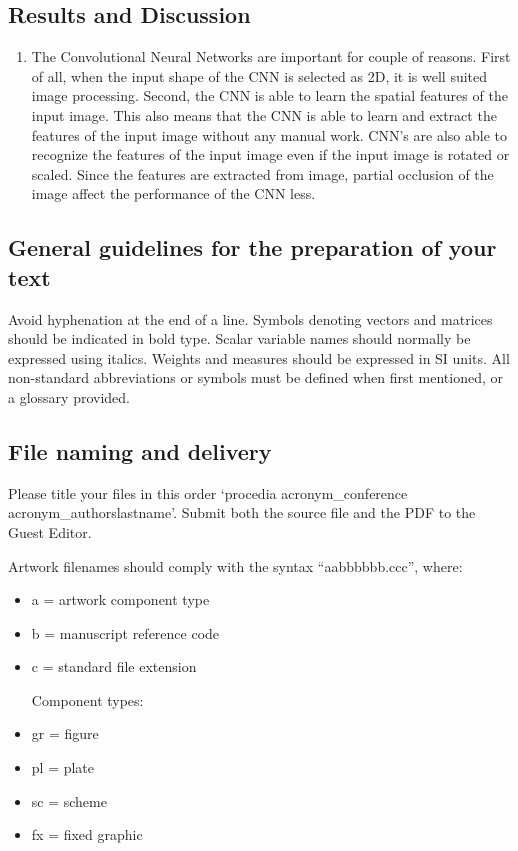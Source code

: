 \documentclass[3p,times,procedia]{elsarticle}
\begin{document}
\vspace{-0.5cm}
\subsection{\textbf{Results and Discussion}}
\begin{enumerate}
    \item The Convolutional Neural Networks are important for couple of reasons.
    First of all, when the input shape of the CNN is selected as 2D, it is well suited image processing.
    Second, the CNN is able to learn the spatial features of the input image. This also means that the CNN is able to learn and extract the features of the input image without any manual work.
    CNN's are also able to recognize the features of the input image even if the input image is rotated or scaled.
    Since the features are extracted from image, partial occlusion of the image affect the performance of the CNN less.
\end{enumerate}

\subsection{General guidelines for the preparation of your text}
Avoid hyphenation at the end of a line. Symbols denoting vectors and matrices should be indicated in bold type. Scalar variable names should normally be expressed using italics. Weights and measures should be expressed in SI units. All non-standard abbreviations or symbols must be defined when first mentioned, or a glossary provided.

\subsection{File naming and delivery}
Please title your files in this order `procedia acronym\_conference acronym\_authorslastname'.  Submit both the source file and the PDF to the Guest Editor.

Artwork filenames should comply with the syntax ``aabbbbbb.ccc'', where:
\begin{itemize}
\item a = artwork component type
\item b = manuscript reference code
\item c = standard file extension

Component types:
\item gr = figure
\item pl = plate
\item sc = scheme
\item fx = fixed graphic
\end{itemize}
\end{document}
